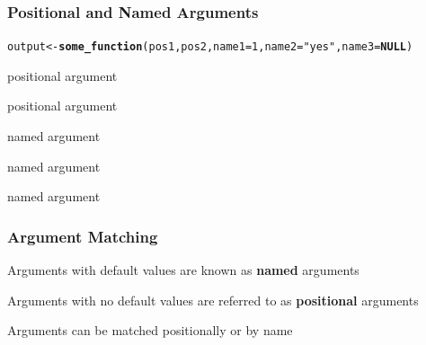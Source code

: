 \documentclass[12pt]{beamer}\usepackage[]{graphicx}\usepackage[]{color}
\makeatletter
\newcommand{\hlnum}[1]{\textcolor[rgb]{0.686,0.059,0.569}{#1}}%
\newcommand{\hlstr}[1]{\textcolor[rgb]{0.192,0.494,0.8}{#1}}%
\newcommand{\hlstd}[1]{\textcolor[rgb]{0.345,0.345,0.345}{#1}}%
\newcommand{\hlkwa}[1]{\textcolor[rgb]{0.161,0.373,0.58}{\textbf{#1}}}%
\newcommand{\hlkwb}[1]{\textcolor[rgb]{0.69,0.353,0.396}{#1}}%
\newcommand{\hlkwc}[1]{\textcolor[rgb]{0.333,0.667,0.333}{#1}}%
\newcommand{\hlkwd}[1]{\textcolor[rgb]{0.737,0.353,0.396}{\textbf{#1}}}%
\newenvironment{kframe}{%
 \def\at@end@of@kframe{}%
 \ifinner\ifhmode%
  \def\at@end@of@kframe{\end{minipage}}%
  \begin{minipage}{\columnwidth}%
 \fi\fi%
 \def\FrameCommand##1{\hskip\@totalleftmargin \hskip-\fboxsep
 \colorbox{shadecolor}{##1}\hskip-\fboxsep
     \hskip-\linewidth \hskip-\@totalleftmargin \hskip\columnwidth}%
 \MakeFramed {\advance\hsize-\width
   \@totalleftmargin\z@ \linewidth\hsize
   \@setminipage}}%
 {\par\unskip\endMakeFramed%
 \at@end@of@kframe}
\newenvironment{knitrout}{}{} %
\makeatother
\begin{document}

\begin{frame}[fragile]
\frametitle{Positional and Named Arguments}

\begin{knitrout}\footnotesize
{}\color{fgcolor}\begin{kframe}
\begin{alltt}
\hlstd{output} \hlkwb{<-} \hlkwd{some_function}\hlstd{(pos1, pos2,} \hlkwc{name1} \hlstd{=} \hlnum{1}\hlstd{,} \hlkwc{name2} \hlstd{=} \hlstr{"yes"}\hlstd{,} \hlkwc{name3} \hlstd{=} \hlkwa{NULL}\hlstd{)}
\end{alltt}
\end{kframe}
\end{knitrout}

\bi
  \item {\hilit {}} positional argument
  \item {\hilit {}} positional argument
  \item {\hilit {}} named argument
  \item {\hilit {}} named argument
  \item {\hilit {}} named argument
\ei

\end{frame}


\begin{frame}[fragile]
\frametitle{Argument Matching}

\bi
  \item Arguments with default values are known as \textbf{named} arguments
  \item Arguments with no default values are referred to as \textbf{positional} arguments
  \item Arguments can be matched positionally or by name
\ei

\end{frame}

\end{document}
